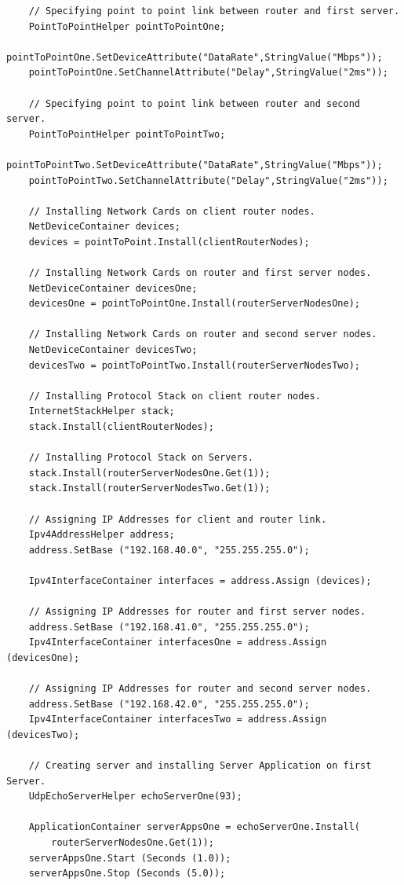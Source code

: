 \documentclass[fullpage]{article}
\begin{document}
\begin{verbatim}
    // Specifying point to point link between router and first server.
    PointToPointHelper pointToPointOne;
    pointToPointOne.SetDeviceAttribute("DataRate",StringValue("Mbps"));
    pointToPointOne.SetChannelAttribute("Delay",StringValue("2ms"));

    // Specifying point to point link between router and second server.
    PointToPointHelper pointToPointTwo;
    pointToPointTwo.SetDeviceAttribute("DataRate",StringValue("Mbps"));
    pointToPointTwo.SetChannelAttribute("Delay",StringValue("2ms"));

    // Installing Network Cards on client router nodes.
    NetDeviceContainer devices;
    devices = pointToPoint.Install(clientRouterNodes);

    // Installing Network Cards on router and first server nodes.
    NetDeviceContainer devicesOne;
    devicesOne = pointToPointOne.Install(routerServerNodesOne);

    // Installing Network Cards on router and second server nodes.
    NetDeviceContainer devicesTwo;
    devicesTwo = pointToPointTwo.Install(routerServerNodesTwo);

    // Installing Protocol Stack on client router nodes.
    InternetStackHelper stack;
    stack.Install(clientRouterNodes);

    // Installing Protocol Stack on Servers.
    stack.Install(routerServerNodesOne.Get(1));
    stack.Install(routerServerNodesTwo.Get(1));

    // Assigning IP Addresses for client and router link.
    Ipv4AddressHelper address;
    address.SetBase ("192.168.40.0", "255.255.255.0");

    Ipv4InterfaceContainer interfaces = address.Assign (devices);

    // Assigning IP Addresses for router and first server nodes.
    address.SetBase ("192.168.41.0", "255.255.255.0");
    Ipv4InterfaceContainer interfacesOne = address.Assign (devicesOne);

    // Assigning IP Addresses for router and second server nodes.
    address.SetBase ("192.168.42.0", "255.255.255.0");
    Ipv4InterfaceContainer interfacesTwo = address.Assign (devicesTwo);

    // Creating server and installing Server Application on first Server.
    UdpEchoServerHelper echoServerOne(93);

    ApplicationContainer serverAppsOne = echoServerOne.Install(
        routerServerNodesOne.Get(1));
    serverAppsOne.Start (Seconds (1.0));
    serverAppsOne.Stop (Seconds (5.0));


\end{verbatim}
\end{document}
